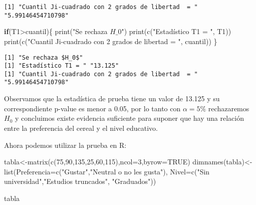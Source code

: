 \documentclass[
  a4paper,
  oneside,
  openany]{book}
\newenvironment{Shaded}{\begin{snugshade}}{\end{snugshade}}
\newcommand{\AttributeTok}[1]{\textcolor[rgb]{0.77,0.63,0.00}{#1}}
\newcommand{\ConstantTok}[1]{\textcolor[rgb]{0.00,0.00,0.00}{#1}}
\newcommand{\ControlFlowTok}[1]{\textcolor[rgb]{0.13,0.29,0.53}{\textbf{#1}}}
\newcommand{\DecValTok}[1]{\textcolor[rgb]{0.00,0.00,0.81}{#1}}
\newcommand{\FunctionTok}[1]{\textcolor[rgb]{0.00,0.00,0.00}{#1}}
\newcommand{\NormalTok}[1]{#1}
\newcommand{\OtherTok}[1]{\textcolor[rgb]{0.56,0.35,0.01}{#1}}
\newcommand{\SpecialCharTok}[1]{\textcolor[rgb]{0.00,0.00,0.00}{#1}}
\newcommand{\StringTok}[1]{\textcolor[rgb]{0.31,0.60,0.02}{#1}}
\begin{document}
\begin{verbatim}
[1] "Cuantil Ji-cuadrado con 2 grados de libertad  = " "5.99146454710798"                                
\end{verbatim}

\begin{Shaded}
\begin{Highlighting}[]
\ControlFlowTok{if}\NormalTok{(T1}\SpecialCharTok{\textgreater{}}\NormalTok{cuantil)\{}
  \FunctionTok{print}\NormalTok{(}\StringTok{"Se rechaza $H\_0$"}\NormalTok{)}
  \FunctionTok{print}\NormalTok{(}\FunctionTok{c}\NormalTok{(}\StringTok{"Estadístico T1 = "}\NormalTok{, T1))}
  \FunctionTok{print}\NormalTok{(}\FunctionTok{c}\NormalTok{(}\StringTok{"Cuantil Ji{-}cuadrado con 2 grados de libertad  = "}\NormalTok{, cuantil))}
\NormalTok{\}}
\end{Highlighting}
\end{Shaded}

\begin{verbatim}
[1] "Se rechaza $H_0$"
[1] "Estadístico T1 = " "13.125"           
[1] "Cuantil Ji-cuadrado con 2 grados de libertad  = " "5.99146454710798"                                
\end{verbatim}

Observamos que la estadística de prueba tiene un valor de 13.125 y su correspondiente p-value es menor a 0.05, por lo tanto con \(\alpha=5\%\) rechazaremos \(H_0\) y concluimos existe evidencia suficiente para suponer que hay una relación entre la preferencia del cereal y el nivel
educativo.

Ahora podemos utilizar la prueba en R:

\begin{Shaded}
\begin{Highlighting}[]
\NormalTok{tabla}\OtherTok{\textless{}{-}}\FunctionTok{matrix}\NormalTok{(}\FunctionTok{c}\NormalTok{(}\DecValTok{75}\NormalTok{,}\DecValTok{90}\NormalTok{,}\DecValTok{135}\NormalTok{,}\DecValTok{25}\NormalTok{,}\DecValTok{60}\NormalTok{,}\DecValTok{115}\NormalTok{),}\AttributeTok{ncol=}\DecValTok{3}\NormalTok{,}\AttributeTok{byrow=}\ConstantTok{TRUE}\NormalTok{)}
\FunctionTok{dimnames}\NormalTok{(tabla)}\OtherTok{\textless{}{-}} \FunctionTok{list}\NormalTok{(}\AttributeTok{Preferencia=}\FunctionTok{c}\NormalTok{(}\StringTok{"Gustar"}\NormalTok{,}\StringTok{"Neutral o no les gusta"}\NormalTok{), }\AttributeTok{Nivel=}\FunctionTok{c}\NormalTok{(}\StringTok{"Sin universidad"}\NormalTok{,}\StringTok{"Estudios truncados"}\NormalTok{,}
                      \StringTok{"Graduados"}\NormalTok{))}


\NormalTok{tabla}
\end{Highlighting}
\end{Shaded}
\end{document}
